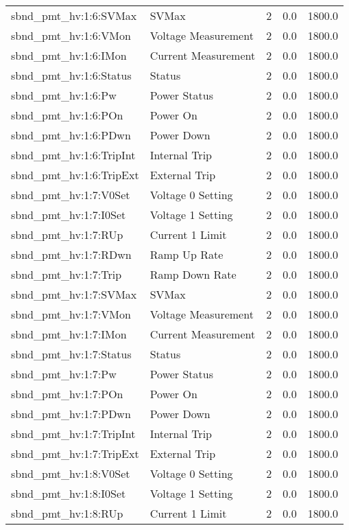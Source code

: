 \begin{center}
\begin{longtable}{l | l l l l }
sbnd\_pmt\_hv:1:6:SVMax & SVMax & 2 & 0.0 & 1800.0\\ 
sbnd\_pmt\_hv:1:6:VMon & Voltage Measurement & 2 & 0.0 & 1800.0\\ 
sbnd\_pmt\_hv:1:6:IMon & Current Measurement & 2 & 0.0 & 1800.0\\ 
sbnd\_pmt\_hv:1:6:Status & Status & 2 & 0.0 & 1800.0\\ 
sbnd\_pmt\_hv:1:6:Pw & Power Status & 2 & 0.0 & 1800.0\\ 
sbnd\_pmt\_hv:1:6:POn & Power On & 2 & 0.0 & 1800.0\\ 
sbnd\_pmt\_hv:1:6:PDwn & Power Down & 2 & 0.0 & 1800.0\\ 
sbnd\_pmt\_hv:1:6:TripInt & Internal Trip & 2 & 0.0 & 1800.0\\ 
sbnd\_pmt\_hv:1:6:TripExt & External Trip & 2 & 0.0 & 1800.0\\ 
sbnd\_pmt\_hv:1:7:V0Set & Voltage 0 Setting & 2 & 0.0 & 1800.0\\ 
sbnd\_pmt\_hv:1:7:I0Set & Voltage 1 Setting & 2 & 0.0 & 1800.0\\ 
sbnd\_pmt\_hv:1:7:RUp & Current 1 Limit & 2 & 0.0 & 1800.0\\ 
sbnd\_pmt\_hv:1:7:RDwn & Ramp Up Rate & 2 & 0.0 & 1800.0\\ 
sbnd\_pmt\_hv:1:7:Trip & Ramp Down Rate & 2 & 0.0 & 1800.0\\ 
sbnd\_pmt\_hv:1:7:SVMax & SVMax & 2 & 0.0 & 1800.0\\ 
sbnd\_pmt\_hv:1:7:VMon & Voltage Measurement & 2 & 0.0 & 1800.0\\ 
sbnd\_pmt\_hv:1:7:IMon & Current Measurement & 2 & 0.0 & 1800.0\\ 
sbnd\_pmt\_hv:1:7:Status & Status & 2 & 0.0 & 1800.0\\ 
sbnd\_pmt\_hv:1:7:Pw & Power Status & 2 & 0.0 & 1800.0\\ 
sbnd\_pmt\_hv:1:7:POn & Power On & 2 & 0.0 & 1800.0\\ 
sbnd\_pmt\_hv:1:7:PDwn & Power Down & 2 & 0.0 & 1800.0\\ 
sbnd\_pmt\_hv:1:7:TripInt & Internal Trip & 2 & 0.0 & 1800.0\\ 
sbnd\_pmt\_hv:1:7:TripExt & External Trip & 2 & 0.0 & 1800.0\\ 
sbnd\_pmt\_hv:1:8:V0Set & Voltage 0 Setting & 2 & 0.0 & 1800.0\\ 
sbnd\_pmt\_hv:1:8:I0Set & Voltage 1 Setting & 2 & 0.0 & 1800.0\\ 
sbnd\_pmt\_hv:1:8:RUp & Current 1 Limit & 2 & 0.0 & 1800.0\\ 

\end{longtable}
\end{center}
